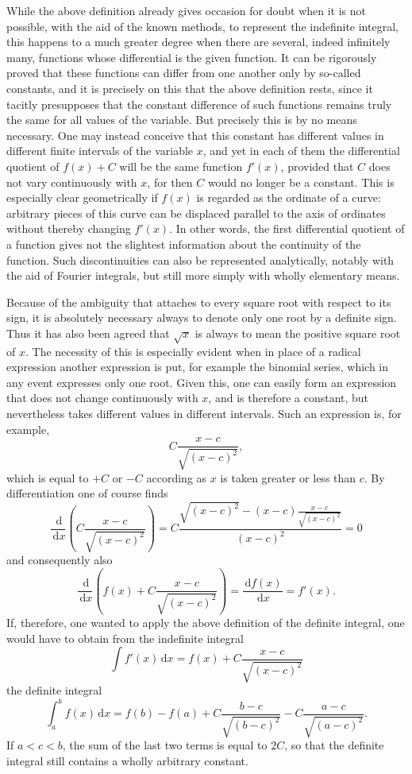\documentclass[11pt]{article}
\newcommand{\dd}{\,\mathrm d}
\begin{document}
While the above definition already gives occasion for doubt when it is not possible, with the aid of the known methods, to represent the indefinite integral, this happens to a much greater degree when there are several, indeed infinitely many, functions whose differential is the given function. It can be rigorously proved that these functions can differ from one another only by so-called constants, and it is precisely on this that the above definition rests, since it tacitly presupposes that the constant difference of such functions remains truly the same for all values of the variable. But precisely this is by no means necessary. One may instead conceive that this constant has different values in different finite intervals of the variable $x$, and yet in each of them the differential quotient of $f(x)+C$ will be the same function $f'(x)$, provided that $C$ does not vary continuously with $x$, for then $C$ would no longer be a constant. This is especially clear geometrically if $f(x)$ is regarded as the ordinate of a curve: arbitrary pieces of this curve can be displaced parallel to the axis of ordinates without thereby changing $f'(x)$. In other words, the first differential quotient of a function gives not the slightest information about the continuity of the function. Such discontinuities can also be represented analytically, notably with the aid of Fourier integrals, but still more simply with wholly elementary means.

Because of the ambiguity that attaches to every square root with respect to its sign, it is absolutely necessary always to denote only one root by a definite sign. Thus it has also been agreed that $\sqrt{x}$ is always to mean the positive square root of $x$. The necessity of this is especially evident when in place of a radical expression another expression is put, for example the binomial series, which in any event expresses only one root. Given this, one can easily form an expression that does not change continuously with $x$, and is therefore a constant, but nevertheless takes different values in different intervals. Such an expression is, for example,
\[
C\frac{x-c}{\sqrt{(x-c)^2}},
\]
which is equal to $+C$ or $-C$ according as $x$ is taken greater or less than $c$. By differentiation one of course finds
\[
\frac{\dd}{\dd x}\left(C\frac{x-c}{\sqrt{(x-c)^2}}\right)
=C\frac{\sqrt{(x-c)^2}-(x-c)\frac{x-c}{\sqrt{(x-c)^2}}}{(x-c)^2}=0
\]
and consequently also
\[
\frac{\dd}{\dd x}\left(f(x)+C\frac{x-c}{\sqrt{(x-c)^2}}\right)=\frac{\dd f(x)}{\dd x}=f'(x).
\]
If, therefore, one wanted to apply the above definition of the definite integral, one would have to obtain from the indefinite integral
\[
\int f'(x)\dd x=f(x)+C\frac{x-c}{\sqrt{(x-c)^2}}
\]
the definite integral
\[
\int_a^b f(x)\dd x=f(b)-f(a)+C\frac{b-c}{\sqrt{(b-c)^2}}-C\frac{a-c}{\sqrt{(a-c)^2}}.
\]
If $a<c<b$, the sum of the last two terms is equal to $2C$, so that the definite integral still contains a wholly arbitrary constant.
\end{document}

